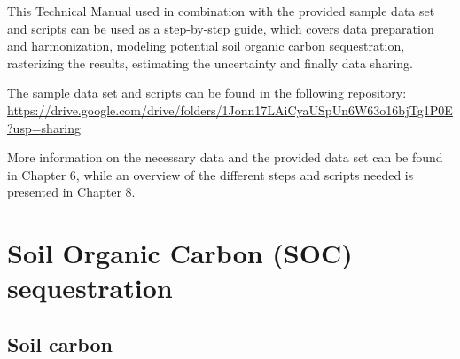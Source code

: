 \documentclass[
  10pt,
  b5paper,
]{book}
\begin{document}
This Technical Manual used in combination with the provided sample data set and scripts can be used as a step-by-step guide, which covers data preparation and harmonization, modeling potential soil organic carbon sequestration, rasterizing the results, estimating the uncertainty and finally data sharing.

The sample data set and scripts can be found in the following repository:
\url{https://drive.google.com/drive/folders/1Jonn17LAiCyaUSpUn6W63o16bjTg1P0E?usp=sharing}

More information on the necessary data and the provided data set can be found in Chapter 6, while an overview of the different steps and scripts needed is presented in Chapter 8.

\hypertarget{soil-organic-carbon-soc-sequestration}{%
\chapter{\textbar{} Soil Organic Carbon (SOC) sequestration}\label{soil-organic-carbon-soc-sequestration}}

\hypertarget{soil-carbon}{%
\section{Soil carbon}\label{soil-carbon}}
\end{document}
